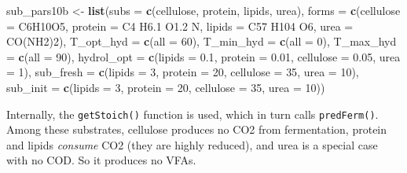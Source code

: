 \documentclass[
]{article}
\newenvironment{Shaded}{\begin{snugshade}}{\end{snugshade}}
\newcommand{\AttributeTok}[1]{\textcolor[rgb]{0.13,0.29,0.53}{#1}}
\newcommand{\DecValTok}[1]{\textcolor[rgb]{0.00,0.00,0.81}{#1}}
\newcommand{\FloatTok}[1]{\textcolor[rgb]{0.00,0.00,0.81}{#1}}
\newcommand{\FunctionTok}[1]{\textcolor[rgb]{0.13,0.29,0.53}{\textbf{#1}}}
\newcommand{\NormalTok}[1]{#1}
\newcommand{\OtherTok}[1]{\textcolor[rgb]{0.56,0.35,0.01}{#1}}
\newcommand{\StringTok}[1]{\textcolor[rgb]{0.31,0.60,0.02}{#1}}
\begin{document}
\begin{Shaded}
\begin{Highlighting}[]
\NormalTok{sub\_pars10b }\OtherTok{\textless{}{-}} \FunctionTok{list}\NormalTok{(}\AttributeTok{subs =} \FunctionTok{c}\NormalTok{(}\StringTok{\textquotesingle{}cellulose\textquotesingle{}}\NormalTok{, }\StringTok{\textquotesingle{}protein\textquotesingle{}}\NormalTok{, }\StringTok{\textquotesingle{}lipids\textquotesingle{}}\NormalTok{, }\StringTok{\textquotesingle{}urea\textquotesingle{}}\NormalTok{),}
                    \AttributeTok{forms =} \FunctionTok{c}\NormalTok{(}\AttributeTok{cellulose =} \StringTok{\textquotesingle{}C6H10O5\textquotesingle{}}\NormalTok{, }\AttributeTok{protein =} \StringTok{\textquotesingle{}C4 H6.1 O1.2 N\textquotesingle{}}\NormalTok{,}
                              \AttributeTok{lipids =} \StringTok{\textquotesingle{}C57 H104 O6\textquotesingle{}}\NormalTok{, }\AttributeTok{urea =} \StringTok{\textquotesingle{}CO(NH2)2\textquotesingle{}}\NormalTok{),}
                    \AttributeTok{T\_opt\_hyd =} \FunctionTok{c}\NormalTok{(}\AttributeTok{all =} \DecValTok{60}\NormalTok{),}
                    \AttributeTok{T\_min\_hyd =} \FunctionTok{c}\NormalTok{(}\AttributeTok{all =} \DecValTok{0}\NormalTok{),}
                    \AttributeTok{T\_max\_hyd =} \FunctionTok{c}\NormalTok{(}\AttributeTok{all =} \DecValTok{90}\NormalTok{),}
                    \AttributeTok{hydrol\_opt =} \FunctionTok{c}\NormalTok{(}\AttributeTok{lipids =} \FloatTok{0.1}\NormalTok{, }\AttributeTok{protein =} \FloatTok{0.01}\NormalTok{, }\AttributeTok{cellulose =} \FloatTok{0.05}\NormalTok{, }\AttributeTok{urea =} \DecValTok{1}\NormalTok{),}
                    \AttributeTok{sub\_fresh =} \FunctionTok{c}\NormalTok{(}\AttributeTok{lipids =} \DecValTok{3}\NormalTok{, }\AttributeTok{protein =} \DecValTok{20}\NormalTok{, }\AttributeTok{cellulose =} \DecValTok{35}\NormalTok{, }\AttributeTok{urea =} \DecValTok{10}\NormalTok{),}
                    \AttributeTok{sub\_init =} \FunctionTok{c}\NormalTok{(}\AttributeTok{lipids =} \DecValTok{3}\NormalTok{, }\AttributeTok{protein =} \DecValTok{20}\NormalTok{, }\AttributeTok{cellulose =} \DecValTok{35}\NormalTok{, }\AttributeTok{urea =} \DecValTok{10}\NormalTok{))}
\end{Highlighting}
\end{Shaded}

Internally, the \texttt{getStoich()} function is used, which in turn
calls \texttt{predFerm()}. Among these substrates, cellulose produces no
CO2 from fermentation, protein and lipids \emph{consume} CO2 (they are
highly reduced), and urea is a special case with no COD. So it produces
no VFAs.
\end{document}

